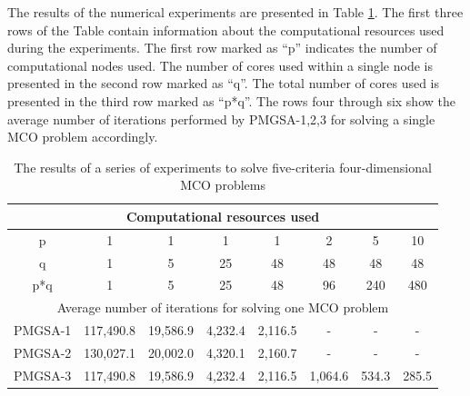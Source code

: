 \documentclass[review]{elsarticle}
\begin{document}
The results of the numerical experiments are presented in Table \ref{tab:2}. The first three rows of the Table contain information about the computational resources used during the experiments. The first row marked as ``p'' indicates the number of computational nodes used. The number of cores used within a single node is presented in the second row marked as ``q''. The total number of cores used is presented in the third row marked as ``p*q''. The rows four through six show the average number of iterations performed by PMGSA-1,2,3 for solving a single MCO problem accordingly.

\begin{table}[ht]
\centering
\caption{The results of a series of experiments to solve five-criteria four-dimensional MCO problems}
\label{tab:2}
\begin{adjustbox}{max width=\textwidth}
\begin{tabular}{cccccccc}
\hline
\multicolumn{8}{c}{Computational resources used}                                                                                                                           \\ \hline
p                   & 1                     & 1                   & 1                  & 1                  & 2                  & 5                  & 10                 \\
q                   & 1                     & 5                   & 25                 & 48                 & 48                 & 48                 & 48                 \\
p*q                 & 1                     & 5                   & 25                 & 48                 & 96                 & 240                & 480                \\ \hline
\multicolumn{8}{c}{Average number of iterations for solving one   MCO problem}                                                                                             \\ \hline
PMGSA-1             & 117,490.8             & 19,586.9            & 4,232.4            & 2,116.5            & -                  & -                  & -                  \\
PMGSA-2             & 130,027.1             & 20,002.0            & 4,320.1            & 2,160.7            & -                  & -                  & -                  \\
PMGSA-3             & 117,490.8             & 19,586.9            & 4,232.4            & 2,116.5            & 1,064.6            & 534.3              & 285.5              \\ \hline

\end{tabular}
\end{adjustbox}
\end{table}
\end{document}

